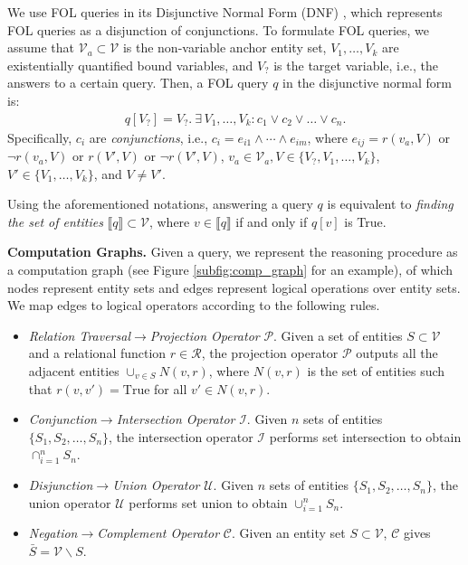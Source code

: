 \documentclass{article}
\begin{document}
We use FOL queries in its Disjunctive Normal Form (DNF) \cite{dnf}, which represents FOL queries as a disjunction of conjunctions.
To formulate FOL queries, we assume that $\mathcal{V}_a\subset \mathcal{V}$ is the non-variable anchor entity set, $V_1,\dots,V_k$ are existentially quantified bound variables, and $V_?$ is the target variable, i.e., the answers to a certain query. Then, a FOL query $q$ in the disjunctive normal form is:
\begin{align*}
    q[V_?]=V_?.\ \exists\,V_1,\ldots,V_k:c_1\lor c_2\lor \dots \lor c_n.
\end{align*}
Specifically, $c_i$ are \textit{conjunctions}, i.e., $c_i=e_{i1}\land \cdots\land e_{im}$, where $e_{ij}=r(v_a,V)$ or $\neg r(v_a,V)$ or $r(V',V)$ or $\neg r(V',V)$, $v_a\in\mathcal{V}_a,  V\in\{V_?,V_1,\dots,V_k\}$, $V'\in\{V_1,\dots,V_k\}$, and $ V\ne V'.$

Using the aforementioned notations, answering a query $q$ is equivalent to \textit{finding the set of entities} $\llbracket q\rrbracket\subset \mathcal{V}$, where $v\in\llbracket q\rrbracket$ if and only if $q[v]$ is True. 

\textbf{Computation Graphs. } Given a query, we represent the reasoning procedure as a computation graph (see Figure \ref{subfig:comp_graph} for an example),
of which nodes represent entity sets and edges represent logical operations over entity sets. 
We map edges to logical operators according to the following rules. 
\vspace{-2mm}
\begin{itemize}[leftmargin=8mm]
    \item \textit{Relation Traversal}$\rightarrow$\textit{Projection Operator} $\mathcal{P}$. Given a set of entities $S\subset \mathcal{V}$ and a relational function $r\in\mathcal{R}$, the projection operator $\mathcal{P}$ outputs all the adjacent entities $\cup_{v\in S}N(v,r)$, where $N(v,r)$ is the set of entities such that $r(v,v')=\text{True}$ for all $v'\in N(v,r)$.
    \item \textit{Conjunction}$\rightarrow$\textit{Intersection Operator} $\mathcal{I}$. Given $n$ sets of entities $\{S_1,S_2,\dots,S_n\}$, the intersection operator $\mathcal{I}$ performs set intersection to obtain $\cap_{i=1}^n S_n$.
    \item \textit{Disjunction}$\rightarrow$\textit{Union Operator} $\mathcal{U}$. Given $n$ sets of entities $\{S_1,S_2,\dots,S_n\}$, the union operator $\mathcal{U}$ performs set union to obtain $\cup_{i=1}^n S_n$.
    \item \textit{Negation}$\rightarrow$\textit{Complement Operator} $\mathcal{C}$. Given an entity set $S\subset \mathcal{V}$, $\mathcal{C}$ gives $\bar{S}=\mathcal{V}\backslash S$.
\end{itemize}
\end{document}
